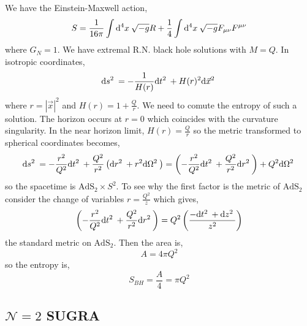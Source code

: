 \documentclass[12pt]{extarticle}
\newcommand{\AdS}[1]{\mathrm{AdS}_{#1}}
\begin{document}
We have the Einstein-Maxwell action,
\[ S = \frac{1}{16 \pi} \int \mathrm{d}^{4} x \: \sqrt{-g} R + \frac{1}{4} \int \mathrm{d}^{4} x \: \sqrt{-g} F_{\mu \nu} F^{\mu \nu} \]
where $G_N = 1$. We have extremal R.N. black hole solutions with $M = Q$. In isotropic coordinates,
\[ \mathrm{d}s^2 \: = - \frac{1}{H(r)} \mathrm{d}t^2 \: + H(r)^2 \mathrm{d}\vec{x}^2 \: \]
where $r = |\vec{x}|^2$ and $H(r) = 1 + \frac{Q}{r}$. We need to comute the entropy of such a solution. The horizon occurs at $r = 0$ which coincides with the curvature singularity. In the near horizon limit, $H(r) = \frac{Q}{r}$ so the metric transformed to spherical coordinates becomes,
\[ \mathrm{d}s^2 \: = - \frac{r^2}{Q^2} \mathrm{d}t^2 \: + \frac{Q^2}{r^2} \left( \mathrm{d}r^2 \: + r^2 \mathrm{d}\Omega^2 \: \right) = \left( - \frac{r^2}{Q^2} \mathrm{d}t^2 \: + \frac{Q^2}{r^2} \mathrm{d}r^2 \: \right) + Q^2 \mathrm{d}\Omega^2 \: \]
so the spacetime is $\AdS{2} \times S^2$. To see why the first factor is the metric of $\AdS{2}$ consider the change of variables $r = \frac{Q^2}{z}$ which gives,
\[ \left( - \frac{r^2}{Q^2} \mathrm{d}t^2 \: + \frac{Q^2}{r^2} \mathrm{d}r^2 \: \right) = Q^2 \left( \frac{- \mathrm{d}t^2 \: + \mathrm{d}z^2 \:}{z^2} \right) \]
the standard metric on $\AdS{2}$. Then the area is,
\[ A = 4 \pi Q^2 \]
so the entropy is,
\[ S_{BH} = \frac{A}{4} = \pi Q^2 \] 
 
\subsection{$\mathcal{N} = 2$ SUGRA}
\end{document}
